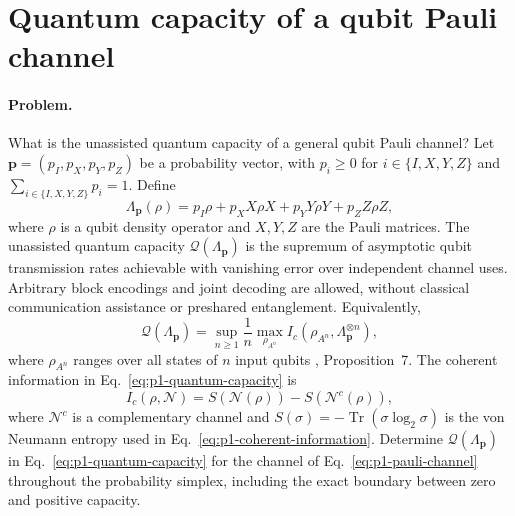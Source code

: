 \section{Quantum capacity of a qubit Pauli channel}
\label{sec:op_43d4aca67bd52554}

\paragraph{Problem.}
What is the unassisted quantum capacity of a general qubit Pauli channel?
Let $\mathbf p=(p_I,p_X,p_Y,p_Z)$ be a probability vector, with $p_i\geq0$
for $i\in\{I,X,Y,Z\}$ and $\sum_{i\in\{I,X,Y,Z\}}p_i=1$.  Define
\begin{equation}
  \Lambda_{\mathbf p}(\rho)
  =p_I\rho+p_XX\rho X+p_YY\rho Y+p_ZZ\rho Z,
  \label{eq:p1-pauli-channel}
\end{equation}
where $\rho$ is a qubit density operator and $X,Y,Z$ are the Pauli matrices.
The unassisted quantum capacity $\mathcal Q(\Lambda_{\mathbf p})$ is the
supremum of asymptotic qubit transmission rates achievable with vanishing
error over independent channel uses.  Arbitrary block encodings and joint
decoding are allowed, without classical communication assistance or
preshared entanglement.  Equivalently,
\begin{equation}
  \mathcal Q(\Lambda_{\mathbf p})
  =\sup_{n\geq1}\frac1n\max_{\rho_{A^n}}
    I_c\!\left(\rho_{A^n},\Lambda_{\mathbf p}^{\otimes n}\right),
  \label{eq:p1-quantum-capacity}
\end{equation}
where $\rho_{A^n}$ ranges over all states of $n$ input qubits
, Proposition~7.  The coherent information
in Eq.~\eqref{eq:p1-quantum-capacity} is
\begin{equation}
  I_c(\rho,\mathcal N)
  =S(\mathcal N(\rho))-S(\mathcal N^c(\rho)),
  \label{eq:p1-coherent-information}
\end{equation}
where $\mathcal N^c$ is a complementary channel and
$S(\sigma)=-\operatorname{Tr}(\sigma\log_2\sigma)$ is the von Neumann entropy
used in Eq.~\eqref{eq:p1-coherent-information}.  Determine
$\mathcal Q(\Lambda_{\mathbf p})$ in Eq.~\eqref{eq:p1-quantum-capacity} for
the channel of Eq.~\eqref{eq:p1-pauli-channel} throughout the probability
simplex, including the exact boundary between zero and positive capacity.

